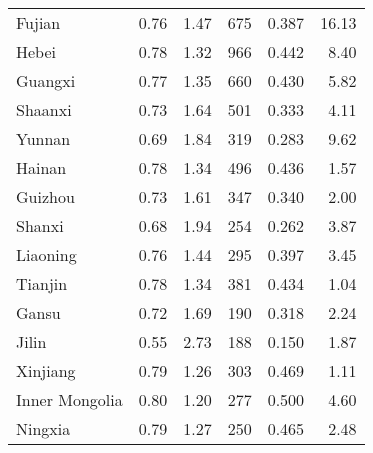 \begin{tabular}{lrrrrr}
 Fujian         &  0.76 &                   1.47 &                675 &                          0.387 &       16.13 \\
 Hebei          &  0.78 &                   1.32 &                966 &                          0.442 &        8.40 \\
 Guangxi        &  0.77 &                   1.35 &                660 &                          0.430 &        5.82 \\
 Shaanxi        &  0.73 &                   1.64 &                501 &                          0.333 &        4.11 \\
 Yunnan         &  0.69 &                   1.84 &                319 &                          0.283 &        9.62 \\
 Hainan         &  0.78 &                   1.34 &                496 &                          0.436 &        1.57 \\
 Guizhou        &  0.73 &                   1.61 &                347 &                          0.340 &        2.00 \\
 Shanxi         &  0.68 &                   1.94 &                254 &                          0.262 &        3.87 \\
 Liaoning       &  0.76 &                   1.44 &                295 &                          0.397 &        3.45 \\
 Tianjin        &  0.78 &                   1.34 &                381 &                          0.434 &        1.04 \\
 Gansu          &  0.72 &                   1.69 &                190 &                          0.318 &        2.24 \\
 Jilin          &  0.55 &                   2.73 &                188 &                          0.150 &        1.87 \\
 Xinjiang       &  0.79 &                   1.26 &                303 &                          0.469 &        1.11 \\
 Inner Mongolia &  0.80 &                   1.20 &                277 &                          0.500 &        4.60 \\
 Ningxia        &  0.79 &                   1.27 &                250 &                          0.465 &        2.48 \\
\hline
\end{tabular}